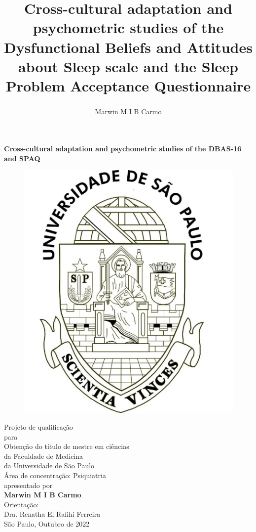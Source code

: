 \documentclass[
  ,doc,11pt, twoside,floatsintext]{apa6}
\title{Cross-cultural adaptation and psychometric studies of the Dysfunctional Beliefs and Attitudes about Sleep scale and the Sleep Problem Acceptance Questionnaire}
\author{Marwin M I B Carmo\textsuperscript{}}
\date{}
\affiliation{\vspace{0.5cm}\textsuperscript{} }
\begin{document}
\maketitle

\newpage
\setcounter{page}{1}

\thispagestyle{empty}
\begin{center}
\vspace*{10mm}
\textbf{\Large Cross-cultural adaptation and psychometric studies of the DBAS-16 and SPAQ}\\
\bigskip
\begin{figure}[h]
\begin{center}
\includegraphics[width=!,totalheight=!,scale=0.18]{usp-brazao.jpg}
\end{center}
\end{figure}
{ 
Projeto de qualificação\\
para\\ 
Obtenção do título de mestre em ciências\\
da Faculdade de Medicina\\
da Universidade de São Paulo  \\
Área de concentração: Psiquiatria  \\
apresentado por  \\ 
\smallskip
\textbf{Marwin M I B Carmo}\\
\smallskip
Orientação:  \\
Dra. Renatha El Rafihi Ferreira  \\
\smallskip
São Paulo, Outubro de 2022\\
}
\end{center}
\end{document}
